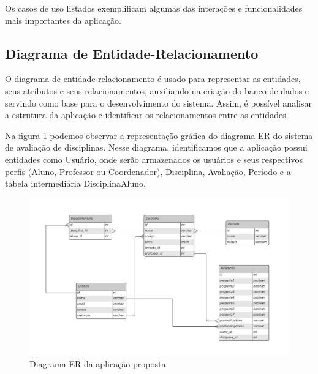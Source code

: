 Os casos de uso listados exemplificam algumas das interações e funcionalidades mais importantes da aplicação.

\subsection{Diagrama de Entidade-Relacionamento}

O diagrama de entidade-relacionamento é usado para representar as entidades, seus atributos e seus relacionamentos, auxiliando na criação do banco de dados e servindo como base para o desenvolvimento do sistema. Assim, é possível analisar a estrutura da aplicação e identificar os relacionamentos entre as entidades.

Na figura \ref{fig:fig_diagrama_er} podemos observar a representação gráfica do diagrama ER do sistema de avaliação de disciplinas. Nesse diagrama, identificamos que a aplicação possui entidades como Usuário, onde serão armazenados os usuários e seus respectivos perfis (Aluno, Professor ou Coordenador), Disciplina, Avaliação, Período e a tabela intermediária DisciplinaAluno. 

\begin{figure}[h]
  \centering
  \includegraphics[width=1\textwidth]{imagens/diagrama-er-sistema-avaliacao-disciplina.jpeg}
  \caption{Diagrama ER da aplicação proposta}
  \label{fig:fig_diagrama_er}
\end{figure}


%
%
%



%

